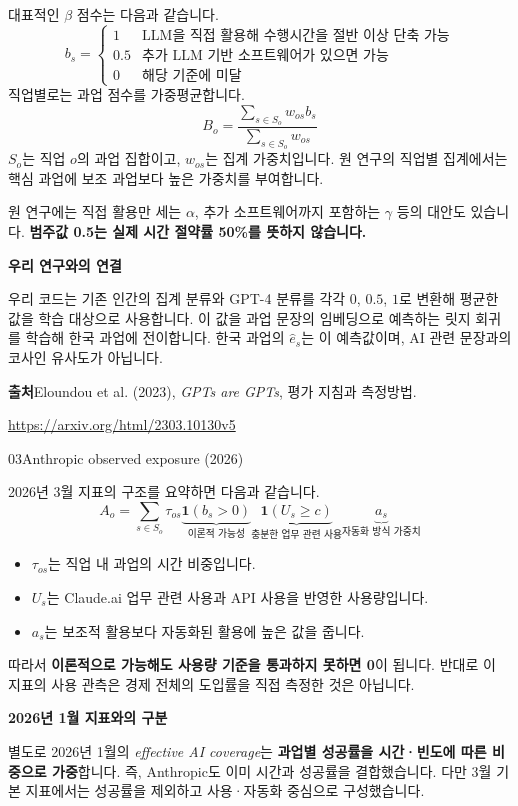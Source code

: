 \documentclass[11pt,a4paper]{article}
\newcommand{\pagetitle}[2]{{\small\sffamily\color{ink}#1\par}\vspace{3mm}{\LARGE\bfseries #2\par}\vspace{4mm}}
\newcommand{\source}[2]{{\small\textbf{출처}\enspace #1\par\url{#2}\par}}
\begin{document}
대표적인 $\beta$ 점수는 다음과 같습니다.
\[
b_s=\begin{cases}
1 & \text{LLM을 직접 활용해 수행시간을 절반 이상 단축 가능}\\[4pt]
0.5 & \text{추가 LLM 기반 소프트웨어가 있으면 가능}\\[4pt]
0 & \text{해당 기준에 미달}
\end{cases}
\]
직업별로는 과업 점수를 가중평균합니다.
\[
B_o=\frac{\sum_{s\in S_o}w_{os}b_s}{\sum_{s\in S_o}w_{os}}
\]
$S_o$는 직업 $o$의 과업 집합이고, $w_{os}$는 집계 가중치입니다. 원 연구의 직업별 집계에서는 핵심 과업에 보조 과업보다 높은 가중치를 부여합니다.

원 연구에는 직접 활용만 세는 $\alpha$, 추가 소프트웨어까지 포함하는 $\gamma$ 등의 대안도 있습니다. \textbf{범주값 0.5는 실제 시간 절약률 50\%를 뜻하지 않습니다.}

\textbf{우리 연구와의 연결}\par
우리 코드는 기존 인간의 집계 분류와 GPT-4 분류를 각각 $0$, $0.5$, $1$로 변환해 평균한 값을 학습 대상으로 사용합니다. 이 값을 과업 문장의 임베딩으로 예측하는 릿지 회귀를 학습해 한국 과업에 전이합니다. 한국 과업의 $\hat e_s$는 이 예측값이며, AI 관련 문장과의 코사인 유사도가 아닙니다.

\source{Eloundou et al. (2023), \textit{GPTs are GPTs}, 평가 지침과 측정방법.}{https://arxiv.org/html/2303.10130v5}

\newpage
\pagetitle{03\quad Anthropic observed exposure (2026)}{실제 사용이 확인되는지를 추가하는 방식}
2026년 3월 지표의 구조를 요약하면 다음과 같습니다.
\[
A_o=\sum_{s\in S_o}\tau_{os}
\underbrace{\mathbf1(b_s>0)}_{\text{이론적 가능성}}
\underbrace{\mathbf1(U_s\geq c)}_{\text{충분한 업무 관련 사용}}
\underbrace{a_s}_{\text{자동화 방식 가중치}}
\]
\begin{itemize}
\item $\tau_{os}$는 직업 내 과업의 시간 비중입니다.
\item $U_s$는 Claude.ai 업무 관련 사용과 API 사용을 반영한 사용량입니다.
\item $a_s$는 보조적 활용보다 자동화된 활용에 높은 값을 줍니다.
\end{itemize}
따라서 \textbf{이론적으로 가능해도 사용량 기준을 통과하지 못하면 0}이 됩니다. 반대로 이 지표의 사용 관측은 경제 전체의 도입률을 직접 측정한 것은 아닙니다.

\textbf{2026년 1월 지표와의 구분}\par
별도로 2026년 1월의 \textit{effective AI coverage}는 \textbf{과업별 성공률을 시간·빈도에 따른 비중으로 가중}합니다. 즉, Anthropic도 이미 시간과 성공률을 결합했습니다. 다만 3월 기본 지표에서는 성공률을 제외하고 사용·자동화 중심으로 구성했습니다.
\end{document}
